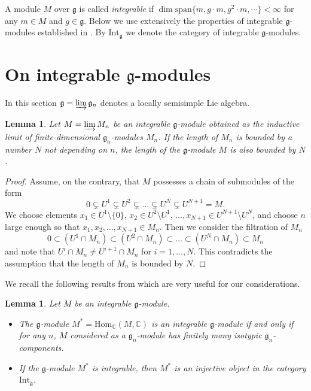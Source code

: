 \documentclass[12pt]{article}
\newcommand{\Int} {\mathrm{Int}}
\newcommand{\Hom} {\mathrm{Hom}}
\def\CC {{\mathbb C}}     %
\def \g {\mathfrak{g}}
\newtheorem{lemma}[theorem]{Lemma}
\begin{document}
A module $M$ over $\g$ is called \textit{integrable} if $\dim \mathrm{span} \{m, g\cdot m, g^2 \cdot m, \cdots \} < \infty$ for any $m \in M$ and $g \in \g$. Below we use extensively the properties of integrable $\g$-modules established in \cite{PS}. By $\Int_{\g}$ we denote the category of integrable $\g$-modules.


\section{On integrable $\g$-modules} \label{sec_Alg}

In this section $\g = \varinjlim \g_n$ denotes a locally semisimple Lie algebra.

\begin{lemma} \label{lemma_finLen} Let $M = \varinjlim M_n$ be an integrable $\g$-module obtained as the inductive limit of finite-dimensional $\g_n$-modules $M_n$. If the length of $M_n$ is bounded by a number $N$ not depending on $n$, the length of the $\g$-module $M$ is also bounded by $N$.
\end{lemma}

\begin{proof}
Assume, on the contrary, that $M$ possesses a chain of submodules of the form
$$
0 \subsetneq U^1 \subsetneq U^2 \subsetneq \dots \subsetneq U^{N} \subsetneq U^{N+1} = M.
$$ 
We choose elements $x_1 \in U^1 \setminus \{0\}$, $x_2 \in U^2 \setminus U^1$, $\dots$$, x_{N+1} \in U^{N+1} \setminus U^N$, and choose $n$ large enough so that $x_1, x_2, \dots, x_{N+1} \in M_n$. Then we consider the filtration of $M_n$
$$
0 \subset (U^1 \cap M_n) \subset (U^2\cap M_n) \subset \dots \subset (U^{N}\cap M_n) \subset M_n
$$
and note that $U^i \cap M_n \neq U^{i+1}\cap M_n$ for $i = 1, \dots, N$.
This contradicts the assumption that the length of $M_n$ is bounded by $N$. %
\end{proof}

We recall the following results from \cite{PS} which are very useful for our considerations.
\begin{lemma} \label{lemma_PS} \cite[Lemma 4.1, Proposition 3.2]{PS} Let $M$ be an integrable $\g$-module.
\begin{itemize}
\item[(a)]The $\g$-module $M^* = \Hom_{\CC}(M, \CC)$ is an integrable $\g$-module if and only if for any $n$, $M$ considered as a $\g_n$-module has finitely many isotypic $\g_n$-components.
\item[(b)] If the $\g$-module $M^*$ is integrable, then $M^*$ is an injective object in the category $\Int_{\g}$.
\end{itemize}
\end{lemma} 
\end{document}
